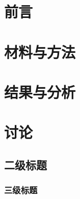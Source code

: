 \documentclass{ctexart}
\begin{document}

\begin{center}
    \tableofcontents    
\end{center}

\setcounter{page}{1}



\clearpage

\begin{abstract}
    \zhlipsum
\end{abstract}

\clearpage



\zhlipsum

\section{前言}
\section{材料与方法}
\section{结果与分析}
\section{讨论}

\subsection{二级标题}

\subsubsection{三级标题}
\end{document}
